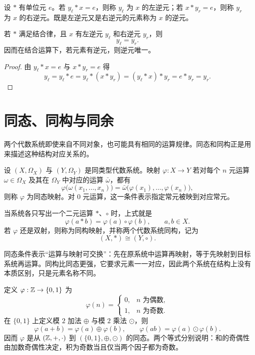 \begin{definition}[一般代数系统中的逆元]\label{general-inverse}
  设 $*$ 有单位元 $e$。若 $y_\ell*x=e$，则称 $y_\ell$ 为 $x$ 的左逆元；若 $x*y_r=e$，则称 $y_r$ 为 $x$ 的右逆元。既是左逆元又是右逆元的元素称为 $x$ 的逆元。
\end{definition}

\begin{theorem}[结合律保证逆元唯一]\label{inverse-unique-associative}
  若 $*$ 满足结合律，且 $x$ 有左逆元 $y_\ell$ 和右逆元 $y_r$，则
  \[
  y_\ell=y_r.
  \]
  因而在结合运算下，若元素有逆元，则逆元唯一。
\end{theorem}

\begin{proof}
  由 $y_\ell*x=e$ 与 $x*y_r=e$ 得
  \[
  y_\ell=y_\ell*e=y_\ell*(x*y_r)=(y_\ell*x)*y_r=e*y_r=y_r.
  \]
\end{proof}

\section{同态、同构与同余}

两个代数系统即使来自不同对象，也可能具有相同的运算规律。同态和同构正是用来描述这种结构对应关系的。

\begin{definition}[同态与同构]\label{hom-iso}
  设 $(X,\Omega_X)$ 与 $(Y,\Omega_Y)$ 是同类型代数系统。映射
  $\varphi:X\to Y$ 若对每个 $n$ 元运算 $\omega\in\Omega_X$ 及其在
  $\Omega_Y$ 中对应的运算 $\bar\omega$，都有
  \[
  \varphi\bigl(\omega(x_1,\ldots,x_n)\bigr)
  =\bar\omega\bigl(\varphi(x_1),\ldots,\varphi(x_n)\bigr),
  \]
  则称 $\varphi$ 为同态映射。对 $0$ 元运算，这一条件表示指定常元被映到对应常元。

  当系统各只写出一个二元运算 $*$、$\circ$ 时，上式就是
  \[
  \varphi(a*b)=\varphi(a)\circ\varphi(b),\qquad a,b\in X.
  \]
  若 $\varphi$ 还是双射，则称为同构映射，并称两个代数系统同构，记为
  \[
  (X,*)\cong(Y,\circ).
  \]
\end{definition}


同态条件表示“运算与映射可交换”：先在原系统中运算再映射，等于先映射到目标系统再运算。同构比同态更强，它要求元素一一对应，因此两个系统在结构上没有本质区别，只是元素名称不同。

\begin{example}[title={奇偶映射保持加法和乘法}]\label{parity-hom}
  定义 $\varphi:\mathbb{Z}\to\{0,1\}$ 为
  \[
  \varphi(n)=
  \begin{cases}
  0,&n\text{ 为偶数},\\
  1,&n\text{ 为奇数}.
  \end{cases}
  \]
  在 $\{0,1\}$ 上定义模 $2$ 加法 $\oplus$ 与模 $2$ 乘法 $\odot$，则
  \[
  \varphi(a+b)=\varphi(a)\oplus\varphi(b),\qquad
  \varphi(ab)=\varphi(a)\odot\varphi(b).
  \]
  因而 $\varphi$ 是从 $(\mathbb{Z},+,\cdot)$ 到 $(\{0,1\},\oplus,\odot)$ 的同态。两个等式分别说明：和的奇偶性由加数奇偶性决定，积为奇数当且仅当两个因子都为奇数。
\end{example}

